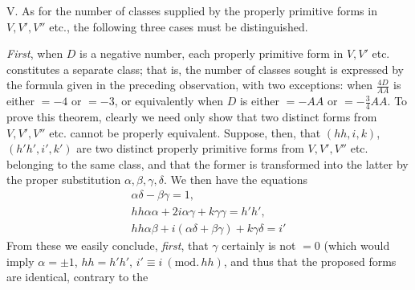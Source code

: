 V. As for the number of classes supplied by the properly primitive forms in \(V,V',V''\) etc., the following three cases must be distinguished.

\textit{First}, when \(D\) is a negative number, each properly primitive form in \(V,V'\) etc. constitutes a separate class; that is, the number of classes sought is expressed by the formula given in the preceding observation, with two exceptions: when \(\frac{4D}{AA}\) is either \(=-4\) or \(=-3\), or equivalently when \(D\) is either \(=-AA\) or \(=-\frac34 AA\). To prove this theorem, clearly we need only show that two distinct forms from \(V,V',V''\) etc. cannot be properly equivalent. Suppose, then, that \((hh,i,k)\), \((h'h',i',k')\) are two distinct properly primitive forms from \(V,V',V''\) etc. belonging to the same class, and that the former is transformed into the latter by the proper substitution \(\alpha,\beta,\gamma,\delta\). We then have the equations
\[
\begin{gathered}\alpha\delta-\beta\gamma=1,\\ hh\alpha\alpha+2i\alpha\gamma+k\gamma\gamma=h'h',\\ hh\alpha\beta+i(\alpha\delta+\beta\gamma)+k\gamma\delta=i'\end{gathered}
\]
From these we easily conclude, \textit{first}, that \(\gamma\) certainly is not \(=0\) (which would imply \(\alpha=\pm1\), \(hh=h'h'\), \(i'\equiv i\ (\mathrm{mod.}\,hh)\), and thus that the proposed forms are identical, contrary to the
